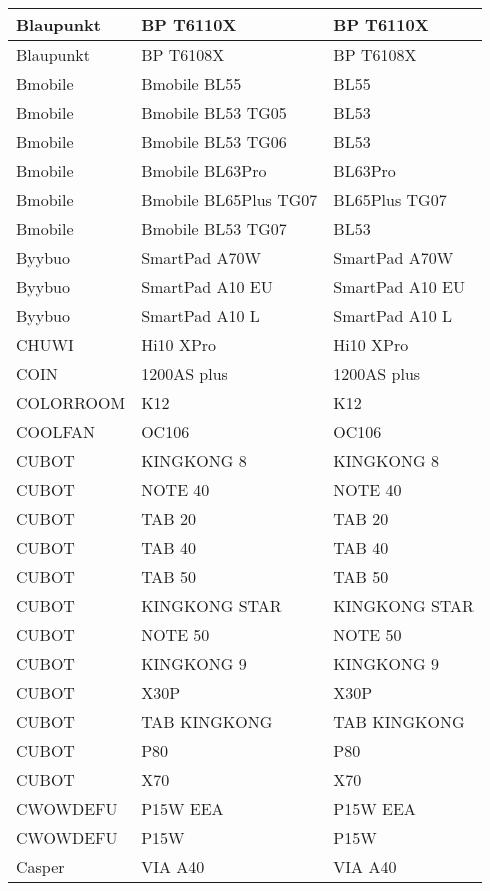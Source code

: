 \begin{tabularx}{\linewidth}{|l|X|X|}
        Blaupunkt & BP T6110X & BP T6110X \\ \hline
        Blaupunkt & BP T6108X & BP T6108X \\ \hline
        Bmobile & Bmobile BL55 & BL55 \\ \hline
        Bmobile & Bmobile BL53 TG05 & BL53 \\ \hline
        Bmobile & Bmobile BL53 TG06 & BL53 \\ \hline
        Bmobile & Bmobile BL63Pro & BL63Pro \\ \hline
        Bmobile & Bmobile BL65Plus TG07 & BL65Plus TG07 \\ \hline
        Bmobile & Bmobile BL53 TG07 & BL53 \\ \hline
        Byybuo & SmartPad A70W & SmartPad A70W \\ \hline
        Byybuo & SmartPad A10 EU & SmartPad A10 EU \\ \hline
        Byybuo & SmartPad A10 L & SmartPad A10 L \\ \hline
        CHUWI & Hi10 XPro & Hi10 XPro \\ \hline
        COIN & 1200AS plus & 1200AS plus \\ \hline
        COLORROOM & K12 & K12 \\ \hline
        COOLFAN & OC106 & OC106 \\ \hline
        CUBOT & KINGKONG 8 & KINGKONG 8 \\ \hline
        CUBOT & NOTE 40 & NOTE 40 \\ \hline
        CUBOT & TAB 20 & TAB 20 \\ \hline
        CUBOT & TAB 40 & TAB 40 \\ \hline
        CUBOT & TAB 50 & TAB 50 \\ \hline
        CUBOT & KINGKONG STAR & KINGKONG STAR \\ \hline
        CUBOT & NOTE 50 & NOTE 50 \\ \hline
        CUBOT & KINGKONG 9 & KINGKONG 9 \\ \hline
        CUBOT & X30P & X30P \\ \hline
        CUBOT & TAB KINGKONG & TAB KINGKONG \\ \hline
        CUBOT & P80 & P80 \\ \hline
        CUBOT & X70 & X70 \\ \hline
        CWOWDEFU & P15W EEA & P15W EEA \\ \hline
        CWOWDEFU & P15W & P15W \\ \hline
        Casper & VIA A40 & VIA A40 \\ \hline

\end{tabularx}
